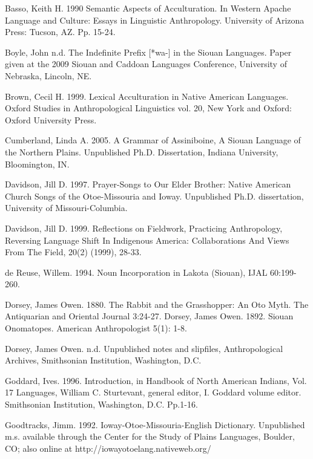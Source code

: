 \documentclass[output=paper]{LSP/langsci}
\begin{document}
\printbibliography[heading=subbibliography,notkeyword=this] 

\begin{reflist}

Basso, Keith  H. 1990  Semantic Aspects of Acculturation. In Western Apache Language and Culture: Essays in Linguistic Anthropology.  University of Arizona Press:  Tucson, AZ.  Pp. 15-24.   

Boyle, John n.d. The Indefinite Prefix [*wa-] in the Siouan Languages. Paper given at the 2009 Siouan and Caddoan Languages Conference, University of Nebraska, Lincoln, NE.             

Brown, Cecil H. 1999. Lexical Acculturation in Native American Languages.  Oxford Studies in Anthropological Linguistics vol. 20, New York and Oxford:  Oxford University Press. 	   

Cumberland, Linda A.  2005. A Grammar of Assiniboine, A Siouan Language of the Northern Plains.  Unpublished Ph.D. Dissertation, Indiana University, Bloomington, IN.   		   
      
Davidson, Jill D.  1997. Prayer-Songs to Our Elder Brother: Native American Church Songs of the Otoe-Missouria and Ioway. Unpublished Ph.D. dissertation, University of Missouri-Columbia. 	        

Davidson, Jill D. 1999.  Reflections on Fieldwork, Practicing Anthropology, Reversing Language Shift In Indigenous America: Collaborations And Views From The Field, 20(2) (1999), 28-33.  		 

de Reuse, Willem. 1994.  Noun Incorporation in Lakota (Siouan),  IJAL 60:199-260.  		  

Dorsey, James Owen. 1880. The Rabbit and the Grasshopper:  An Oto Myth. The Antiquarian and Oriental Journal 3:24-27.										   
Dorsey, James Owen. 1892.  Siouan Onomatopes. American Anthropologist 5(1): 1-8. 

Dorsey, James Owen. n.d.  Unpublished notes and slipfiles, Anthropological Archives, Smithsonian Institution, Washington, D.C.  

Goddard, Ives.  1996.  Introduction, in Handbook of North American Indians, Vol. 17 Languages, William C. Sturtevant, general editor, I. Goddard volume editor.  Smithsonian Institution, Washington, D.C.  Pp.1-16.  							     		                 

Goodtracks, Jimm. 1992. Ioway-Otoe-Missouria-English Dictionary.  Unpublished m.s. available through the Center for the Study of Plains Languages, Boulder, CO;  also online at http://iowayotoelang.nativeweb.org/


\end{reflist}
\end{document}
